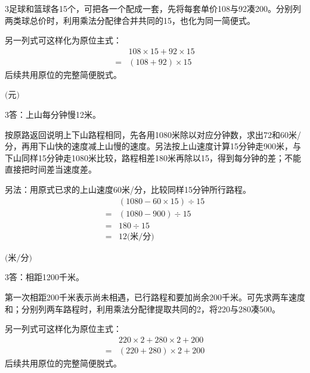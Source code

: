 \documentclass[multi=snippet,border={5bp 20bp 5bp 5bp}]{standalone}
\newenvironment{snippet}[3]{\begin{minipage}{#1bp}\color{answerred}\fontsize{#2}{#3}\selectfont\raggedright}{\end{minipage}}
\begin{document}
\begin{snippet}{505}{11.5}{14}\begin{multicols}{3}\raggedcolumns 足球和篮球各15个，可把各一个配成一套，先将每套单价108与92凑200。分别列两类球总价时，利用乘法分配律合并共同的15，也化为同一简便式。\par 另一列式可这样化为原位主式：\[\begin{aligned}&108\times15+92\times15\\={}&(108+92)\times15\end{aligned}\]后续共用原位的完整简便脱式。\end{multicols}\end{snippet}
\begin{snippet}{80}{9.5}{14}\SourceSans\setlength{\mathindent}{2bp}\(\text{(元)}\)\end{snippet}
\begin{snippet}{505}{11.5}{14}\begin{multicols}{3}\raggedcolumns 答：上山每分钟慢12米。\par 按原路返回说明上下山路程相同，先各用1080米除以对应分钟数，求出72和60米/分，再用下山快的速度减上山慢的速度。另法按上山速度计算15分钟走900米，与下山同样15分钟走1080米比较，路程相差180米再除以15，得到每分钟的差；不能直接把时间差当速度差。\par 另法：用原式已求的上山速度60米/分，比较同样15分钟所行路程。\[\begin{aligned} &(1080-60\times15)\div15\\={}&(1080-900)\div15\\={}&180\div15\\={}&12\text{(米/分)}\end{aligned}\]\end{multicols}\end{snippet}
\begin{snippet}{80}{9.5}{14}\SourceSans\setlength{\mathindent}{2bp}\(\text{(米/分)}\)\end{snippet}
\begin{snippet}{505}{11.5}{14}\begin{multicols}{3}\raggedcolumns 答：相距1200千米。\par 第一次相距200千米表示尚未相遇，已行路程和要加尚余200千米。可先求两车速度和；分别列两车路程时，利用乘法分配律提取共同的2，将220与280凑500。\par 另一列式可这样化为原位主式：\[\begin{aligned}&220\times2+280\times2+200\\={}&(220+280)\times2+200\end{aligned}\]后续共用原位的完整简便脱式。\end{multicols}\end{snippet}
\end{document}
